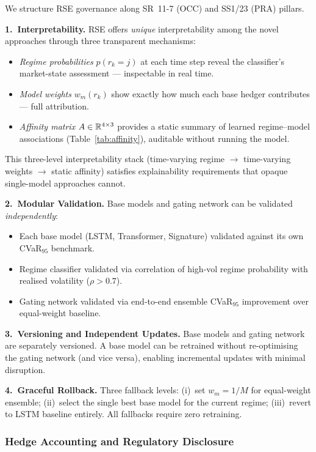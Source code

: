 We structure RSE governance along SR~11-7 (OCC) and SS1/23 (PRA) pillars.

\textbf{1.\ Interpretability.}
RSE offers \emph{unique} interpretability among the novel approaches through three transparent mechanisms:
\begin{itemize}[noitemsep]
    \item \textit{Regime probabilities} $p(r_k=j)$ at each time step reveal the classifier's market-state assessment --- inspectable in real time.
    \item \textit{Model weights} $w_m(r_k)$ show exactly how much each base hedger contributes --- full attribution.
    \item \textit{Affinity matrix} $A \in \mathbb{R}^{4 \times 3}$ provides a static summary of learned regime--model associations (Table~\ref{tab:affinity}), auditable without running the model.
\end{itemize}
This three-level interpretability stack (time-varying regime $\to$ time-varying weights $\to$ static affinity) satisfies explainability requirements that opaque single-model approaches cannot.

\textbf{2.\ Modular Validation.}
Base models and gating network can be validated \emph{independently}:
\begin{itemize}[noitemsep]
    \item Each base model (LSTM, Transformer, Signature) validated against its own CVaR$_{95}$ benchmark.
    \item Regime classifier validated via correlation of high-vol regime probability with realised volatility ($\rho > 0.7$).
    \item Gating network validated via end-to-end ensemble CVaR$_{95}$ improvement over equal-weight baseline.
\end{itemize}

\textbf{3.\ Versioning and Independent Updates.}
Base models and gating network are separately versioned.  A base model can be retrained without re-optimising the gating network (and vice versa), enabling incremental updates with minimal disruption.

\textbf{4.\ Graceful Rollback.}
Three fallback levels: (i)~set $w_m = 1/M$ for equal-weight ensemble; (ii)~select the single best base model for the current regime; (iii)~revert to LSTM baseline entirely.  All fallbacks require zero retraining.

\subsubsection{Hedge Accounting and Regulatory Disclosure}

